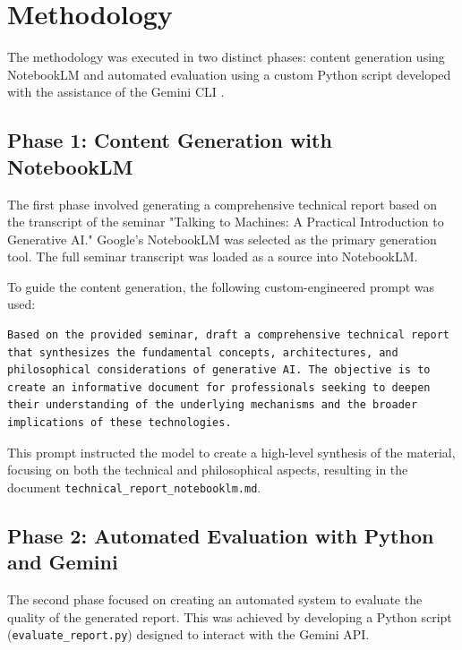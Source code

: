 \section{Methodology}

The methodology was executed in two distinct phases: content generation using NotebookLM \cite{google:notebooklm} and automated evaluation using a custom Python script developed with the assistance of the Gemini CLI \cite{google:geminicli}.

\subsection{Phase 1: Content Generation with NotebookLM}

The first phase involved generating a comprehensive technical report based on the transcript of the seminar "Talking to Machines: A Practical Introduction to Generative AI." Google's NotebookLM \cite{google:notebooklm} was selected as the primary generation tool. The full seminar transcript was loaded as a source into NotebookLM.

To guide the content generation, the following custom-engineered prompt was used:

\begin{lstlisting}[breaklines=true, basicstyle=\ttfamily\small]
Based on the provided seminar, draft a comprehensive technical report that synthesizes the fundamental concepts, architectures, and philosophical considerations of generative AI. The objective is to create an informative document for professionals seeking to deepen their understanding of the underlying mechanisms and the broader implications of these technologies.
\end{lstlisting}

This prompt instructed the model to create a high-level synthesis of the material, focusing on both the technical and philosophical aspects, resulting in the document \texttt{technical\_report\_notebooklm.md}.

\subsection{Phase 2: Automated Evaluation with Python and Gemini}

The second phase focused on creating an automated system to evaluate the quality of the generated report. This was achieved by developing a Python script (\texttt{evaluate\_report.py}) designed to interact with the Gemini API.

